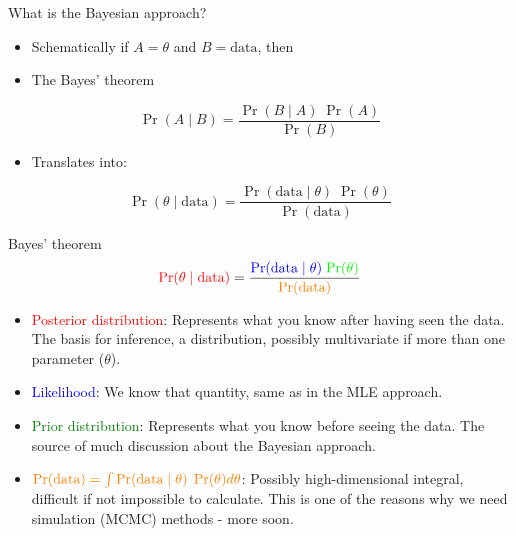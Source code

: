 \documentclass[
  ignorenonframetext,
  aspectratio=169]{beamer}
\providecommand{\tightlist}{%
  \setlength{\itemsep}{0pt}\setlength{\parskip}{0pt}}
\begin{document}
\begin{frame}{What is the Bayesian approach?}
\protect\hypertarget{what-is-the-bayesian-approach-1}{}
\begin{itemize}
\tightlist
\item
  Schematically if \(A = \theta\) and \(B = \text{data}\), then
\end{itemize}

\pause

\begin{itemize}
\tightlist
\item
  The Bayes' theorem
\end{itemize}

\[\Pr(A \mid B) = \frac{\Pr(B \mid A) \; \Pr(A)}{\Pr(B)}\]

\pause

\begin{itemize}
\tightlist
\item
  Translates into:
\end{itemize}

\[\Pr(\theta \mid \text{data}) = \frac{\Pr(\text{data} \mid \theta) \; \Pr(\theta)}{\Pr(\text{data})}\]
\end{frame}

\begin{frame}{Bayes' theorem}
\protect\hypertarget{bayes-theorem-2}{}
\[{\color{red}{\Pr(\theta \mid \text{data})}} = \frac{\color{blue}{\Pr(\text{data} \mid \theta)} \; \color{green}{\Pr(\theta)}}{\color{orange}{\Pr(\text{data})}}\]

\pause

\begin{itemize}
\tightlist
\item
  \textcolor{red}{Posterior distribution}: Represents what you know
  after having seen the data. The basis for inference, a distribution,
  possibly multivariate if more than one parameter (\(\theta\)).
\end{itemize}

\pause

\begin{itemize}
\tightlist
\item
  \textcolor{blue}{Likelihood}: We know that quantity, same as in the
  MLE approach.
\end{itemize}

\pause

\begin{itemize}
\tightlist
\item
  \textcolor{green}{Prior distribution}: Represents what you know before
  seeing the data. The source of much discussion about the Bayesian
  approach.
\end{itemize}

\pause

\begin{itemize}
\tightlist
\item
  \(\color{orange}{\Pr(\text{data}) = \int \Pr(\text{data} \mid \theta) \;\Pr(\theta) d\theta }\):
  Possibly high-dimensional integral, difficult if not impossible to
  calculate. This is one of the reasons why we need simulation (MCMC)
  methods - more soon.
\end{itemize}
\end{frame}
\end{document}
